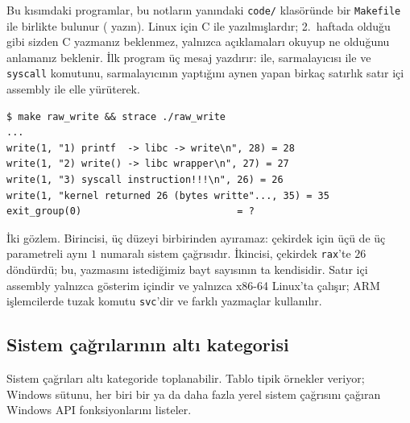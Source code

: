 Bu kısımdaki programlar, bu notların yanındaki \texttt{code/} klasöründe bir \texttt{Makefile} ile birlikte bulunur ( yazın). Linux için C ile yazılmışlardır; 2.~haftada olduğu gibi sizden C yazmanız beklenmez, yalnızca açıklamaları okuyup ne olduğunu anlamanız beklenir. İlk program üç mesaj yazdırır:  ile,  sarmalayıcısı ile ve \texttt{syscall} komutunu, sarmalayıcının yaptığını aynen yapan birkaç satırlık satır içi assembly ile elle yürüterek.



\begin{lstlisting}[style=term]
$ make raw_write && strace ./raw_write
...
write(1, "1) printf  -> libc -> write\n", 28) = 28
write(1, "2) write() -> libc wrapper\n", 27) = 27
write(1, "3) syscall instruction!!!\n", 26) = 26
write(1, "kernel returned 26 (bytes writte"..., 35) = 35
exit_group(0)                           = ?
\end{lstlisting}

İki gözlem. Birincisi,  üç düzeyi birbirinden ayıramaz: çekirdek için üçü de üç parametreli aynı $1$ numaralı sistem çağrısıdır. İkincisi, çekirdek \texttt{rax}'te $26$ döndürdü; bu, yazmasını istediğimiz bayt sayısının ta kendisidir. Satır içi assembly yalnızca gösterim içindir ve yalnızca x86-64 Linux'ta çalışır; ARM işlemcilerde tuzak komutu \texttt{svc}'dir ve farklı yazmaçlar kullanılır.

\subsection{Sistem çağrılarının altı kategorisi}

Sistem çağrıları altı kategoride toplanabilir. Tablo tipik örnekler veriyor; Windows sütunu, her biri bir ya da daha fazla yerel sistem çağrısını çağıran Windows API fonksiyonlarını listeler.

